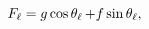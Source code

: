 $\mathop{F_{\ell}\/}\nolimits=g\mathop{\cos\/}\nolimits\mathop{{\theta_{\ell}}%
\/}\nolimits+f\mathop{\sin\/}\nolimits\mathop{{\theta_{\ell}}\/}\nolimits,$